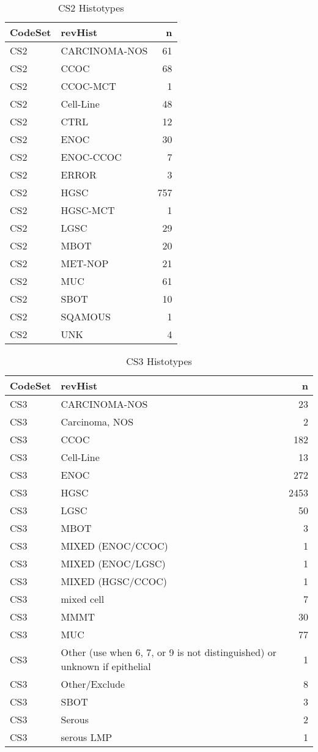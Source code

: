 \documentclass[
]{report}
\begin{document}
\begin{table}

\caption{\label{tab:dist-cs2}CS2 Histotypes}
\centering
\begin{tabular}[t]{l|l|r}
\hline
CodeSet & revHist & n\\
\hline
CS2 & CARCINOMA-NOS & 61\\
\hline
CS2 & CCOC & 68\\
\hline
CS2 & CCOC-MCT & 1\\
\hline
CS2 & Cell-Line & 48\\
\hline
CS2 & CTRL & 12\\
\hline
CS2 & ENOC & 30\\
\hline
CS2 & ENOC-CCOC & 7\\
\hline
CS2 & ERROR & 3\\
\hline
CS2 & HGSC & 757\\
\hline
CS2 & HGSC-MCT & 1\\
\hline
CS2 & LGSC & 29\\
\hline
CS2 & MBOT & 20\\
\hline
CS2 & MET-NOP & 21\\
\hline
CS2 & MUC & 61\\
\hline
CS2 & SBOT & 10\\
\hline
CS2 & SQAMOUS & 1\\
\hline
CS2 & UNK & 4\\
\hline
\end{tabular}
\end{table}

\begin{table}

\caption{\label{tab:dist-cs3}CS3 Histotypes}
\centering
\begin{tabular}[t]{l|l|r}
\hline
CodeSet & revHist & n\\
\hline
CS3 & CARCINOMA-NOS & 23\\
\hline
CS3 & Carcinoma, NOS & 2\\
\hline
CS3 & CCOC & 182\\
\hline
CS3 & Cell-Line & 13\\
\hline
CS3 & ENOC & 272\\
\hline
CS3 & HGSC & 2453\\
\hline
CS3 & LGSC & 50\\
\hline
CS3 & MBOT & 3\\
\hline
CS3 & MIXED (ENOC/CCOC) & 1\\
\hline
CS3 & MIXED (ENOC/LGSC) & 1\\
\hline
CS3 & MIXED (HGSC/CCOC) & 1\\
\hline
CS3 & mixed cell & 7\\
\hline
CS3 & MMMT & 30\\
\hline
CS3 & MUC & 77\\
\hline
CS3 & Other (use when 6, 7, or 9 is not distinguished) or unknown if epithelial & 1\\
\hline
CS3 & Other/Exclude & 8\\
\hline
CS3 & SBOT & 3\\
\hline
CS3 & Serous & 2\\
\hline
CS3 & serous LMP & 1\\
\hline
\end{tabular}
\end{table}
\end{document}
